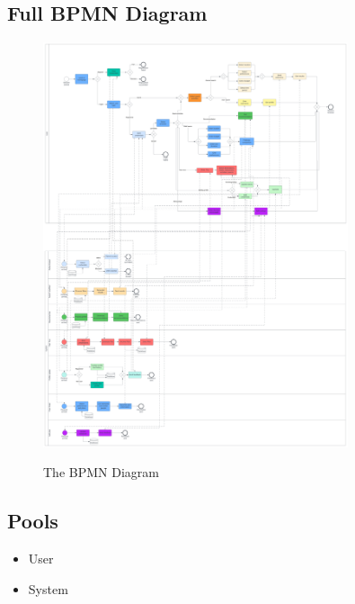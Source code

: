 \documentclass[12pt]{article}
\begin{document}
\subsection{Full BPMN Diagram}
\begin{figure}[H]
    \centering
        \includegraphics[width=0.80\textwidth]{BPMN/bpmn.png}
        \label{fig:bpmn}
    \caption{The BPMN Diagram}
\end{figure}

\newpage
\subsection{Pools}
\begin{itemize}
    \item User
    \item System
\end{itemize}
\end{document}
